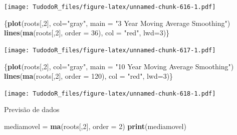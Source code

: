 \documentclass[
]{book}
\newenvironment{Shaded}{\begin{snugshade}}{\end{snugshade}}
\newcommand{\DataTypeTok}[1]{\textcolor[rgb]{0.13,0.29,0.53}{#1}}
\newcommand{\DecValTok}[1]{\textcolor[rgb]{0.00,0.00,0.81}{#1}}
\newcommand{\KeywordTok}[1]{\textcolor[rgb]{0.13,0.29,0.53}{\textbf{#1}}}
\newcommand{\NormalTok}[1]{#1}
\newcommand{\StringTok}[1]{\textcolor[rgb]{0.31,0.60,0.02}{#1}}
\begin{document}
\texttt{[image: TudodoR\_files/figure-latex/unnamed-chunk-616-1.pdf]}

\begin{Shaded}
\begin{Highlighting}[]
\NormalTok{\{}\KeywordTok{plot}\NormalTok{(roots[,}\DecValTok{2}\NormalTok{], }\DataTypeTok{col=}\StringTok{"gray"}\NormalTok{, }\DataTypeTok{main =} \StringTok{"3 Year Moving Average Smoothing"}\NormalTok{)}
\KeywordTok{lines}\NormalTok{(}\KeywordTok{ma}\NormalTok{(roots[,}\DecValTok{2}\NormalTok{], }\DataTypeTok{order =} \DecValTok{36}\NormalTok{), }\DataTypeTok{col =} \StringTok{"red"}\NormalTok{, }\DataTypeTok{lwd=}\DecValTok{3}\NormalTok{)\}}
\end{Highlighting}
\end{Shaded}

\texttt{[image: TudodoR\_files/figure-latex/unnamed-chunk-617-1.pdf]}

\begin{Shaded}
\begin{Highlighting}[]
\NormalTok{\{}\KeywordTok{plot}\NormalTok{(roots[,}\DecValTok{2}\NormalTok{], }\DataTypeTok{col=}\StringTok{"gray"}\NormalTok{, }\DataTypeTok{main =} \StringTok{"10 Year Moving Average Smoothing"}\NormalTok{)}
\KeywordTok{lines}\NormalTok{(}\KeywordTok{ma}\NormalTok{(roots[,}\DecValTok{2}\NormalTok{], }\DataTypeTok{order =} \DecValTok{120}\NormalTok{), }\DataTypeTok{col =} \StringTok{"red"}\NormalTok{, }\DataTypeTok{lwd=}\DecValTok{3}\NormalTok{)\}}
\end{Highlighting}
\end{Shaded}

\texttt{[image: TudodoR\_files/figure-latex/unnamed-chunk-618-1.pdf]}

Previsão de dados

\begin{Shaded}
\begin{Highlighting}[]
\NormalTok{mediamovel =}\StringTok{ }\KeywordTok{ma}\NormalTok{(roots[,}\DecValTok{2}\NormalTok{], }\DataTypeTok{order =} \DecValTok{2}\NormalTok{)}
\KeywordTok{print}\NormalTok{(mediamovel)}
\end{Highlighting}
\end{Shaded}
\end{document}
